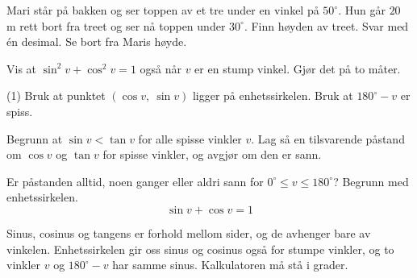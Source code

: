 
Mari står på bakken og ser toppen av et tre under en vinkel på $50^\circ$.
Hun går $20$ m rett bort fra treet og ser nå toppen under $30^\circ$.
Finn høyden av treet. Svar med én desimal. Se bort fra Maris høyde.

Vis at $\sin^2 v + \cos^2 v = 1$ også når $v$ er en stump vinkel. Gjør det på to måter.
\begin{tasks}(1)
  \task Bruk at punktet $(\cos v,\ \sin v)$ ligger på enhetssirkelen.
  \task Bruk at $180^\circ - v$ er spiss.
\end{tasks}

Begrunn at $\sin v < \tan v$ for alle spisse vinkler $v$. Lag så en tilsvarende påstand om $\cos v$ og $\tan v$ for spisse vinkler, og avgjør om den er sann.

Er påstanden alltid, noen ganger eller aldri sann for $0^\circ \le v \le 180^\circ$? Begrunn med enhetssirkelen.
\[ \sin v + \cos v = 1 \]

\begin{oppsummering}
Sinus, cosinus og tangens er forhold mellom sider, og de avhenger bare av vinkelen.
Enhetssirkelen gir oss sinus og cosinus også for stumpe vinkler, og to vinkler $v$ og $180^\circ - v$ har samme sinus.
Kalkulatoren må stå i grader.
\end{oppsummering}
